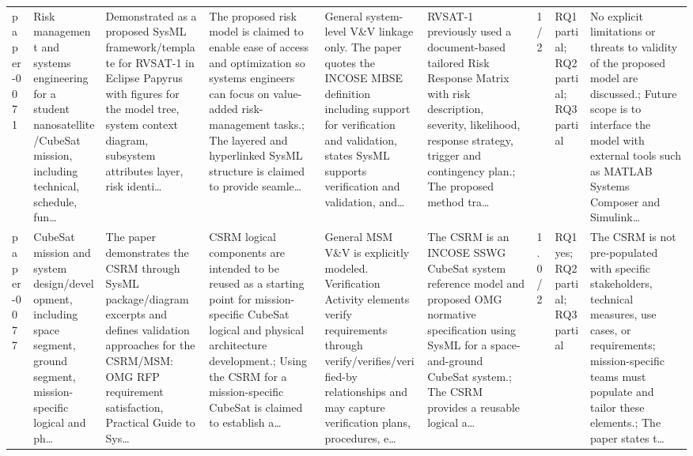 \documentclass[10pt]{article}
\begin{document}
\begin{landscape}
\begin{longtable}{p{1.0cm}p{2.4cm}p{3.1cm}p{3.7cm}p{3.4cm}p{3.1cm}p{1.0cm}p{1.8cm}p{3.4cm}}
paper-0071 & Risk management and systems engineering for a student nanosatellite/CubeSat mission, including technical, schedule, fun… & Demonstrated as a proposed SysML framework/template for RVSAT-1 in Eclipse Papyrus with figures for the model tree, system context diagram, subsystem attributes layer, risk identi… & The proposed risk model is claimed to enable ease of access and optimization so systems engineers can focus on value-added risk-management tasks.; The layered and hyperlinked SysML structure is claimed to provide seamle… & General system-level V\&V linkage only. The paper quotes the INCOSE MBSE definition including support for verification and validation, states SysML supports verification and validation, and… & RVSAT-1 previously used a document-based tailored Risk Response Matrix with risk description, severity, likelihood, response strategy, trigger and contingency plan.; The proposed method tra… & 1/2 & RQ1 partial; RQ2 partial; RQ3 partial & No explicit limitations or threats to validity of the proposed model are discussed.; Future scope is to interface the model with external tools such as MATLAB Systems Composer and Simulink… \\
paper-0077 & CubeSat mission and system design/development, including space segment, ground segment, mission-specific logical and ph… & The paper demonstrates the CSRM through SysML package/diagram excerpts and defines validation approaches for the CSRM/MSM: OMG RFP requirement satisfaction, Practical Guide to Sys… & CSRM logical components are intended to be reused as a starting point for mission-specific CubeSat logical and physical architecture development.; Using the CSRM for a mission-specific CubeSat is claimed to establish a… & General MSM V\&V is explicitly modeled. Verification Activity elements verify requirements through verify/verifies/verified-by relationships and may capture verification plans, procedures, e… & The CSRM is an INCOSE SSWG CubeSat system reference model and proposed OMG normative specification using SysML for a space-and-ground CubeSat system.; The CSRM provides a reusable logical a… & 1.0/2 & RQ1 yes; RQ2 partial; RQ3 partial & The CSRM is not pre-populated with specific stakeholders, technical measures, use cases, or requirements; mission-specific teams must populate and tailor these elements.; The paper states t… \\

\end{longtable}
\end{landscape}
\end{document}
